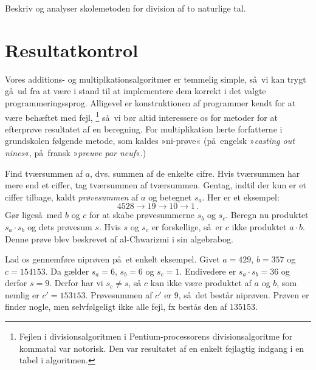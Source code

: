 \begin{exerc} 
  Beskriv og analyser skolemetoden for division
  af to naturlige tal. 
\end{exerc}

\section{Resultatkontrol}

Vores additions- og multiplkationsalgoritmer er temmelig simple, så vi kan trygt gå ud fra at være i stand til at implementere dem korrekt i det valgte programmeringssprog.
Alligevel er konstruktionen af programmer kendt for at være behæftet med fejl,%
\footnote{Fejlen i divisionsalgoritmen i Pentium-processorens divisionsalgoritme for kommatal var notorisk.
Den var resultatet af en enkelt fejlagtig indgang i en tabel i algoritmen.
}
så vi bør altid interessere os for metoder for at efterprøve resultatet af en beregning.
For multiplikation lærte forfatterne i grundskolen følgende metode, som kaldes »ni-prøve«
(på engelsk »\emph{casting out nines}«,  på fransk »\emph{preuve par neuf}«.)

Find tværsummen af $a$, dvs. summen af de enkelte cifre.
Hvis tværsummen har mere end et ciffer, tag tværsummen af tværsummen.
Gentag, indtil der kun er et ciffer tilbage, kaldt \emph{prøvesummen}
 af $a$ og betegnet $s_a$.
Her er et eksempel:
\[ 4528 \rightarrow 19 \rightarrow 10 \rightarrow 1 \,.\]
Gør ligeså med $b$ og $c$ for at skabe prøvesummerne $s_b$ og $s_c$.
Beregn nu produktet $s_a \cdot s_b$ og dets prøvesum $s$.
Hvis $s$ og $s_c$ er forskellige, så er $c$ ikke produktet $a\cdot b$.
Denne prøve blev beskrevet af al-Chwarizmi i sin algebrabog.

Lad os gennemføre niprøven på et enkelt eksempel. 
Givet $a = 429$, $b = 357$ og $c = 154153$.
Da gælder $s_a = 6$, $s_b = 6$ og $s_c = 1$. 
Endivedere er $s_a \cdot s_b = 36$ og derfor $s = 9$.
Derfor har vi $s_c \not= s$, så $c$ kan ikke være produktet af $a$ og $b$, som nemlig er $c' = 153153$. 
Prøvesummen af $c'$ er $9$, så det består niprøven.
Prøven er finder nogle, men selvfølgeligt ikke alle fejl, fx bestås den af $135153$.

